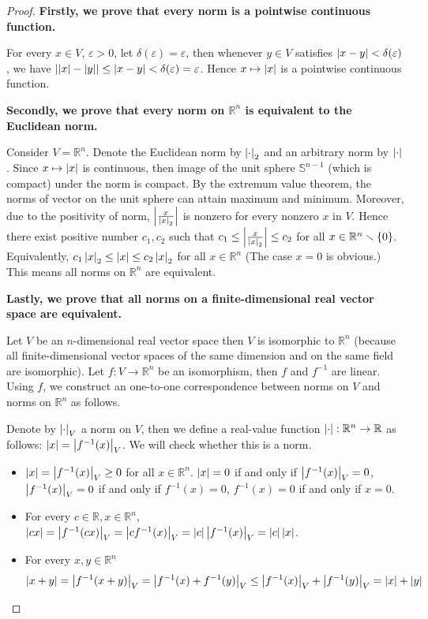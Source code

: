\begin{proof}
	\textbf{Firstly, we prove that every norm is a pointwise continuous function.}

	For every $x\in V$, $\varepsilon > 0$, let $\delta(\varepsilon) = \varepsilon$, then whenever $y\in V$ satisfies $\left\vert{x - y}\right\vert < \delta(\varepsilon)$, we have $\left\vert{\left\vert{x}\right\vert - \left\vert{y}\right\vert}\right\vert \leq \left\vert{x - y}\right\vert < \delta(\varepsilon) = \varepsilon$. Hence $x\mapsto \left\vert{x}\right\vert$ is a pointwise continuous function.

	\textbf{Secondly, we prove that every norm on $\mathbb{R}^{n}$ is equivalent to the Euclidean norm.}

	Consider $V = \mathbb{R}^{n}$. Denote the Euclidean norm by $\left\vert{\cdot}\right\vert_{2}$ and an arbitrary norm by $\left\vert{\cdot}\right\vert$. Since $x\mapsto \left\vert{x}\right\vert$ is continuous, then image of the unit sphere $\mathbb{S}^{n-1}$ (which is compact) under the norm is compact. By the extremum value theorem, the norms of vector on the unit sphere can attain maximum and minimum. Moreover, due to the positivity of norm, $\left\vert{\frac{x}{\left\vert{x}\right\vert_{2}}}\right\vert$ is nonzero for every nonzero $x$ in $V$. Hence there exist positive number $c_{1}, c_{2}$ such that $c_{1} \leq \left\vert{\frac{x}{\left\vert{x}\right\vert_{2}}}\right\vert \leq c_{2}$ for all $x \in \mathbb{R}^{n}\smallsetminus \left\{{0}\right\}$. Equivalently, $c_{1}\left\vert{x}\right\vert_{2} \leq \left\vert{x}\right\vert \leq c_{2}\left\vert{x}\right\vert_{2}$ for all $x \in \mathbb{R}^{n}$ (The case $x = 0$ is obvious.) This means all norms on $\mathbb{R}^{n}$ are equivalent.

	\textbf{Lastly, we prove that all norms on a finite-dimensional real vector space are equivalent.}

	Let $V$ be an $n$-dimensional real vector space then $V$ is isomorphic to $\mathbb{R}^{n}$ (because all finite-dimensional vector spaces of the same dimension and on the same field are isomorphic). Let $f: V \to \mathbb{R}^{n}$ be an isomorphism, then $f$ and $f^{-1}$ are linear. Using $f$, we construct an one-to-one correspondence between norms on $V$ and norms on $\mathbb{R}^{n}$ as follows.

	Denote by $\left\vert{\cdot}\right\vert_{V}$ a norm on $V$, then we define a real-value function $\left\vert{\cdot}\right\vert: \mathbb{R}^{n} \to \mathbb{R}$ as follows: $\left\vert{x}\right\vert = \left\vert{f^{-1}(x)}\right\vert_{V}$. We will check whether this is a norm.
	\begin{itemize}
		\item $\left\vert{x}\right\vert = \left\vert{f^{-1}(x)}\right\vert_{V} \geq 0$ for all $x\in \mathbb{R}^{n}$. $\left\vert{x}\right\vert = 0$ if and only if $\left\vert{f^{-1}(x)}\right\vert_{V} = 0$, $\left\vert{f^{-1}(x)}\right\vert_{V} = 0$ if and only if $f^{-1}(x) = 0$, $f^{-1}(x) = 0$ if and only if $x = 0$.
		\item For every $c\in \mathbb{R}, x\in\mathbb{R}^{n}$, $\left\vert{cx}\right\vert = \left\vert{f^{-1}(cx)}\right\vert_{V} = \left\vert{cf^{-1}(x)}\right\vert_{V} = \left\vert{c}\right\vert\left\vert{f^{-1}(x)}\right\vert_{V} = \left\vert{c}\right\vert\left\vert{x}\right\vert$.
		\item For every $x, y\in \mathbb{R}^{n}$
		      \begin{equation*}
			      \left\vert{x + y}\right\vert = \left\vert{f^{-1}(x + y)}\right\vert_{V} = \left\vert{f^{-1}(x) + f^{-1}(y)}\right\vert_{V} \leq \left\vert{f^{-1}(x)}\right\vert_{V} + \left\vert{f^{-1}(y)}\right\vert_{V} = \left\vert{x}\right\vert + \left\vert{y}\right\vert
		      \end{equation*}
	\end{itemize}


\end{proof}

